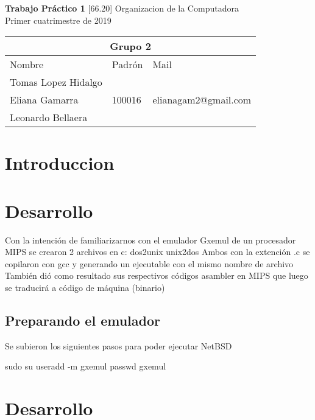 \documentclass[titlepage,a4paper]{article}
\begin{document}
\begin{titlepage} %
    \centering
    \vfill
    \Huge \textbf{Trabajo Práctico 1}
    \vskip2cm
    \Large [66.20] Organizacion de la Computadora\\
    Primer cuatrimestre de 2019 
    \vskip2cm
    \begin{table}[htbp]
	\begin{center}
	\begin{tabular}{|l|l|l|}
	\hline
    \multicolumn{3}{|c|}{Grupo 2} \\ \hline
	Nombre & Padrón & Mail \\ \hline 
    Tomas Lopez Hidalgo & & \\ \hline 
    Eliana Gamarra & 100016 & elianagam2@gmail.com\\ \hline
    Leonardo Bellaera &  & \\ \hline
    \end{tabular}
	\label{tabla:sencilla}
	\end{center}
	\end{table}

    \vfill
\end{titlepage}
\tableofcontents %
\newpage

\section{Introduccion}\label{sec:intro}


\section{Desarrollo}\label{sec:intro}
Con la intención de familiarizarnos con el emulador Gxemul de un procesador MIPS se crearon 2 archivos en c:
dos2unix
unix2dos
Ambos con la extención .c se copilaron con gcc y generando un ejecutable con el mismo nombre de archivo
También dió como resultado sus respectivos códigos asambler en MIPS que luego se traducirá a código de máquina (binario)

\subsection{Preparando el emulador}

Se subieron los siguientes pasos para poder ejecutar NetBSD

sudo su
useradd -m gxemul
passwd gxemul



\section{Desarrollo}\label{sec:intro}
\end{document}
